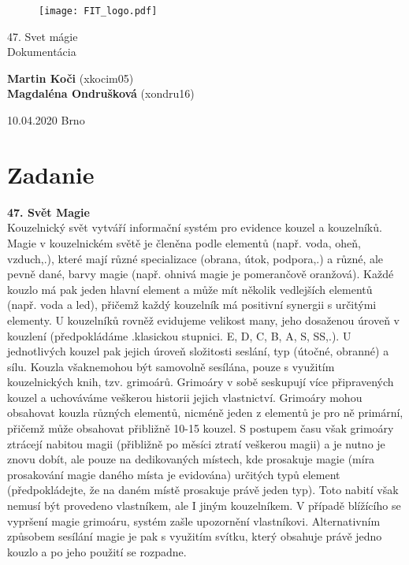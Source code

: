 \documentclass{article}
\begin{document}

 \begin{titlepage}
	\begin{figure}
	    \centering
	    \texttt{[image: FIT\_logo.pdf]}
	\end{figure}
    
	\begin{center}
   \Huge{47. Svet mágie} \\ 
    \LARGE{Dokumentácia} \\ 
	\end{center}
   
     \begin{center}
     \large
         \textbf{Martin Koči} (xkocim05) \\
         \textbf{Magdaléna Ondrušková} (xondru16) \\ 
     \end{center}
   \large{10.04.2020} \hfill \large{Brno}
\end{titlepage}
\newpage
\tableofcontents

\newpage
\section{Zadanie}

\textbf{47. Svět Magie} \\ %
Kouzelnický svět vytváří informační systém pro evidence kouzel a kouzelníků. Magie v kouzelnickém světě je členěna podle elementů (např. voda, oheň, vzduch,.), které mají různé specializace (obrana, útok, podpora,.) a různé, ale pevně dané, barvy magie (např. ohnivá magie je pomerančově oranžová). Každé kouzlo má pak jeden hlavní element a může mít několik vedlejších elementů (např. voda a led), přičemž každý kouzelník má positivní synergii s určitými elementy. U kouzelníků rovněž evidujeme velikost many, jeho dosaženou úroveň v kouzlení (předpokládáme .klasickou stupnici. E, D, C, B, A, S, SS,.). U jednotlivých kouzel pak jejich úroveň složitosti seslání, typ (útočné, obranné) a sílu. Kouzla všaknemohou být samovolně sesílána, pouze s využitím kouzelnických knih, tzv. grimoárů. Grimoáry v sobě seskupují více připravených kouzel a uchováváme veškerou historii jejich vlastnictví. Grimoáry mohou obsahovat kouzla různých elementů, nicméně jeden z elementů je pro ně primární, přičemž může obsahovat přibližně 10-15 kouzel. S postupem času však grimoáry ztrácejí nabitou magii (přibližně po měsíci ztratí veškerou magii) a je nutno je znovu dobít, ale pouze na dedikovaných místech, kde prosakuje magie (míra prosakování magie daného místa je evidována) určitých typů element (předpokládejte, že na daném místě prosakuje právě jeden typ). Toto nabití však nemusí být provedeno vlastníkem, ale I jiným kouzelníkem. V případě blížícího se vypršení magie grimoáru, systém zašle upozornění vlastníkovi. Alternativním způsobem sesílání magie je pak s využitím svítku, který obsahuje právě jedno kouzlo a po jeho použití se rozpadne.
\newpage
\end{document}
